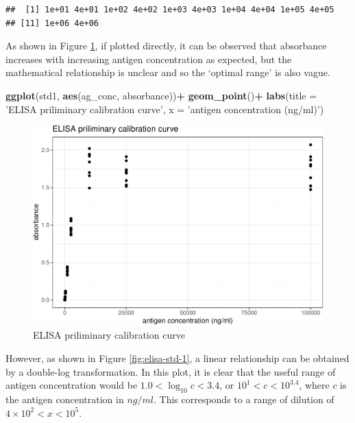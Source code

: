 \documentclass[
]{article}
\newenvironment{Shaded}{\begin{snugshade}}{\end{snugshade}}
\newcommand{\DataTypeTok}[1]{\textcolor[rgb]{0.13,0.29,0.53}{#1}}
\newcommand{\KeywordTok}[1]{\textcolor[rgb]{0.13,0.29,0.53}{\textbf{#1}}}
\newcommand{\NormalTok}[1]{#1}
\newcommand{\OperatorTok}[1]{\textcolor[rgb]{0.81,0.36,0.00}{\textbf{#1}}}
\newcommand{\StringTok}[1]{\textcolor[rgb]{0.31,0.60,0.02}{#1}}
\begin{document}
\begin{verbatim}
##  [1] 1e+01 4e+01 1e+02 4e+02 1e+03 4e+03 1e+04 4e+04 1e+05 4e+05
## [11] 1e+06 4e+06
\end{verbatim}

As shown in Figure \ref{fig:elisa-std-1-raw}, if plotted directly, it can be observed that absorbance increases with increasing antigen concentration as expected, but the mathematical relationship is unclear and so the `optimal range' is also vague.

\begin{Shaded}
\begin{Highlighting}[]
\KeywordTok{ggplot}\NormalTok{(std1, }\KeywordTok{aes}\NormalTok{(ag_conc, absorbance))}\OperatorTok{+}
\StringTok{  }\KeywordTok{geom_point}\NormalTok{()}\OperatorTok{+}
\StringTok{  }\KeywordTok{labs}\NormalTok{(}\DataTypeTok{title =} \StringTok{'ELISA priliminary calibration curve'}\NormalTok{, }\DataTypeTok{x =} \StringTok{'antigen concentration (ng/ml)'}\NormalTok{)}
\end{Highlighting}
\end{Shaded}

\begin{figure}
\includegraphics[width=1\linewidth]{2020-03-08-immunoassay-in-silico_files/figure-latex/elisa-std-1-raw-1} \caption{ELISA priliminary calibration curve}\label{fig:elisa-std-1-raw}
\end{figure}

However, as shown in Figure \ref{fig:elisa-std-1}, a linear relationship can be obtained by a double-log transformation. In this plot, it is clear that the useful range of antigen concentration would be \(1.0<\log_{10}{c}<{3.4}\), or \(10^1 < c < 10^{3.4}\), where \(c\) is the antigen concentration in \(ng/ml\). This corresponds to a range of dilution of \(4\times10^2 < x < 10^5\).
\end{document}
